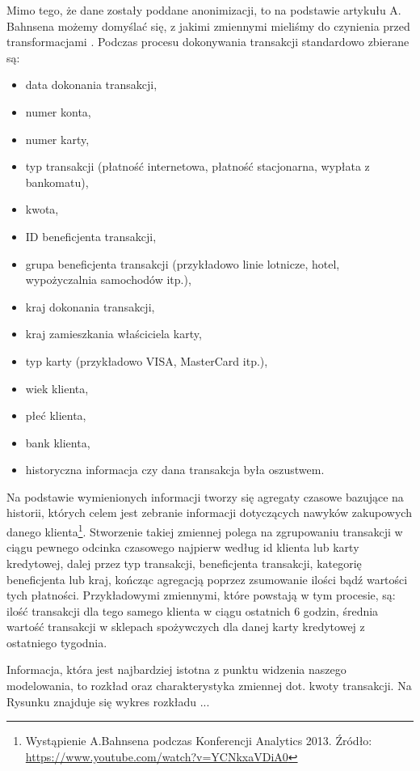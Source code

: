 \documentclass[inzynierska]{pwr_wmat_praca_dyplomowa}
\theoremstyle{plain}
\numberwithin{theorem}{chapter}
\theoremstyle{definition}
\numberwithin{theorem}{chapter}
\begin{document}
Mimo tego, że dane zostały poddane anonimizacji, to na podstawie artykułu A. Bahnsena możemy domyślać się, z jakimi zmiennymi mieliśmy do czynienia przed transformacjami \cite{CSCCFD}. Podczas procesu dokonywania transakcji standardowo zbierane są: 
\begin{itemize}
	\item data dokonania transakcji, 
	\item numer konta,
	\item numer karty,
	\item typ transakcji (płatność internetowa, płatność stacjonarna, wypłata z bankomatu),
	\item kwota, 
	\item ID beneficjenta transakcji,
	\item grupa beneficjenta transakcji (przykładowo linie lotnicze, hotel, wypożyczalnia samochodów itp.), 
	\item kraj dokonania transakcji,
	\item kraj zamieszkania właściciela karty,
	\item typ karty (przykładowo VISA, MasterCard itp.),
	\item wiek klienta, 
 	\item płeć klienta,
	\item bank klienta,
	\item historyczna informacja czy dana transakcja była oszustwem.
\end{itemize}
Na podstawie wymienionych informacji tworzy się agregaty czasowe bazujące na historii, których celem jest zebranie informacji dotyczących nawyków zakupowych danego klienta\footnote{Wystąpienie A.Bahnsena podczas Konferencji Analytics 2013. Źródło: \url{https://www.youtube.com/watch?v=YCNkxaVDiA0}}. Stworzenie takiej zmiennej polega na zgrupowaniu transakcji w ciągu pewnego odcinka czasowego najpierw według id klienta lub karty kredytowej, dalej przez typ transakcji, beneficjenta transakcji, kategorię beneficjenta lub kraj, kończąc agregacją poprzez zsumowanie ilości bądź wartości tych płatności. Przykładowymi zmiennymi, które powstają w tym procesie, są: ilość transakcji dla tego samego klienta w ciągu ostatnich 6 godzin, średnia wartość transakcji w sklepach spożywczych dla danej karty kredytowej z ostatniego tygodnia. 

Informacja, która jest najbardziej istotna z punktu widzenia naszego modelowania, to rozkład oraz charakterystyka zmiennej dot. kwoty transakcji. Na Rysunku znajduje się wykres rozkładu ... 
\end{document}
